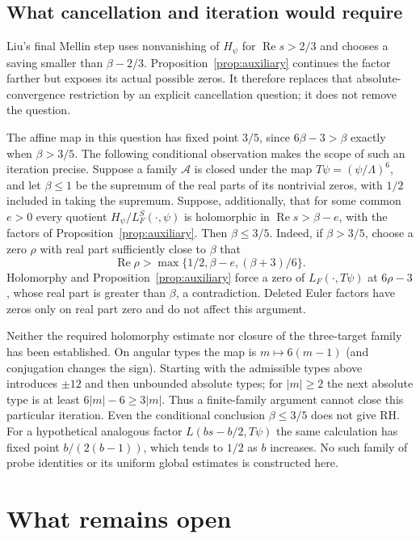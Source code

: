 \documentclass[11pt]{article}
\newcommand{\Rea}{\operatorname{Re}}
\theoremstyle{definition}
\theoremstyle{remark}
\begin{document}
\subsection{What cancellation and iteration would require}

Liu's final Mellin step \cite[Section~7.9]{LiuMixed} uses nonvanishing of
$H_\psi$ for $\Rea s>2/3$ and chooses a saving smaller than
$\beta-2/3$.  Proposition~\ref{prop:auxiliary} continues the factor
farther but exposes its actual possible zeros.  It therefore replaces
that absolute-convergence restriction by an explicit cancellation
question; it does not remove the question.

The affine map in this question has fixed point $3/5$, since
$6\beta-3>\beta$ exactly when $\beta>3/5$.  The following conditional
observation makes the scope of such an iteration precise.  Suppose
a family $\mathcal A$ is closed under the map
$T\psi=(\psi/\Lambda)^6$, and let $\beta\le1$ be the supremum of
the real parts of its nontrivial zeros, with $1/2$ included in taking
the supremum.  Suppose, additionally, that for some common $e>0$
every quotient $H_\psi/L_F^S(\cdot,\psi)$ is holomorphic in
$\Rea s>\beta-e$, with the factors of
Proposition~\ref{prop:auxiliary}.  Then $\beta\le3/5$.
Indeed, if $\beta>3/5$, choose a zero $\rho$ with real part
sufficiently close to $\beta$ that
\[
 \Rea\rho>\max\{1/2,\beta-e,(\beta+3)/6\}.
\]
Holomorphy and Proposition~\ref{prop:auxiliary} force a zero of
$L_F(\cdot,T\psi)$ at $6\rho-3$, whose real part is greater than
$\beta$, a contradiction.  Deleted Euler factors have zeros only
on real part zero and do not affect this argument.

Neither the required holomorphy estimate nor closure of the three-target
family has been established.  On angular types the map is
$m\mapsto6(m-1)$ (and conjugation changes the sign).  Starting with
the admissible types above introduces $\pm12$ and then unbounded
absolute types; for $|m|\ge2$ the next absolute type is at least
$6|m|-6\ge3|m|$.  Thus a finite-family argument cannot close this
particular iteration.  Even the conditional conclusion $\beta\le3/5$
does not give RH.  For a hypothetical analogous factor
$L(bs-b/2,T\psi)$ the same calculation has fixed point
$b/(2(b-1))$, which tends to $1/2$ as $b$ increases.  No such family of
probe identities or its uniform global estimates is constructed here.

\section{What remains open}
\end{document}
